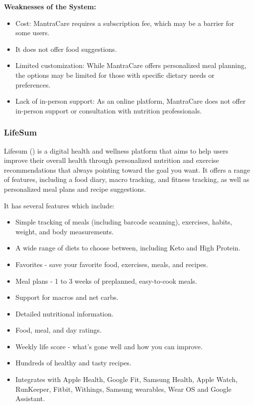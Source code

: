 \documentclass{article}
\begin{document}
\textbf{Weaknesses of the System:}

\begin{itemize}
\item Cost: MantraCare requires a subscription fee, which may be a barrier for some users.
\item It does not offer food suggestions.
\item Limited customization: While MantraCare offers personalized meal planning, the options may be limited for those with specific dietary needs or preferences.
\item Lack of in-person support: As an online platform, MantraCare does not offer in-person support or consultation with nutrition professionals.

\end{itemize}
\subsubsection{LifeSum}

Lifesum (\cite{lifesum}) is a digital health and wellness platform that aims to help users improve their overall health through personalized nutrition and exercise recommendations that always pointing toward the goal you want. It offers a range of features, including a food diary, macro tracking, and fitness tracking, as well as personalized meal plans and recipe suggestions.

It has several features which include:
\begin{itemize}
\item Simple tracking of meals (including barcode scanning), exercises, habits, weight, and body measurements.
\item A wide range of diets to choose between, including Keto and High Protein.
\item Favorites - save your favorite food, exercises, meals, and recipes.
\item Meal plans - 1 to 3 weeks of preplanned, easy-to-cook meals.
\item Support for macros and net carbs.
\item Detailed nutritional information.
\item Food, meal, and day ratings.
\item Weekly life score - what's gone well and how you can improve.
\item Hundreds of healthy and tasty recipes.
\item Integrates with Apple Health, Google Fit, Samsung Health, Apple Watch, RunKeeper, Fitbit, Withings, Samsung wearables, Wear OS and Google Assistant.
\end{itemize}
\end{document}
